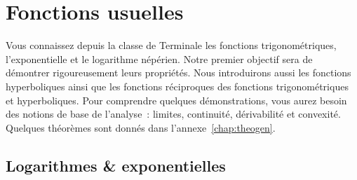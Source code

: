\chapter{Fonctions usuelles}
\label{chap:fonctionsusuelles}
\minitoc
\minilof
\minilot
Vous connaissez depuis la classe de Terminale les fonctions trigonométriques, 
l’exponentielle et le logarithme népérien. Notre premier objectif sera de 
démontrer rigoureusement leurs propriétés. Nous introduirons aussi les fonctions 
hyperboliques ainsi que les fonctions réciproques des fonctions trigonométriques 
et hyperboliques. Pour comprendre quelques démonstrations, vous aurez besoin des 
notions de base de l’analyse~: limites, continuité, dérivabilité et convexité.  
Quelques théorèmes sont donnés dans l'annexe~\ref{chap:theogen}.
\section{Logarithmes \& exponentielles}
\label{sec:chap1-logetexp}
